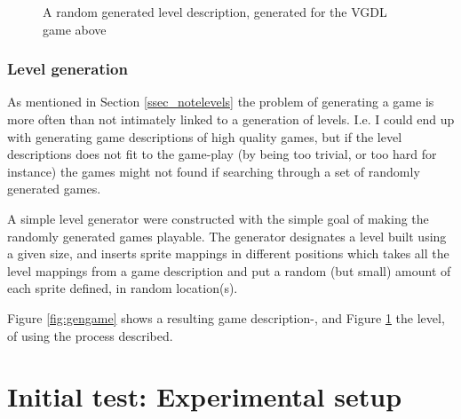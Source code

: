 \documentclass[a4paper,titlepage,final]{report}
\begin{document}
\begin{figure}[!ht]
\centering
\begin{vgdldesc}[linewidth=14cm]
               
  $          & 
               
               
     (  %
\end{vgdldesc}
\caption{A random generated level description, generated for the VGDL game above}
\label{fig:gengamelvl}
\end{figure}



\subsubsection*{Level generation}
As mentioned in Section \ref{ssec_notelevels} the problem of generating a game is more often than not intimately linked to a generation of levels.
I.e. I could end up with generating game descriptions of high quality games, but if the level descriptions does not fit to the game-play (by being too trivial, or too hard for instance) the games might not found if searching through a set of randomly generated games.

A simple level generator were constructed with the simple goal of making the randomly generated games playable.
The generator designates a level built using a given size, and inserts sprite mappings in different positions which takes all the level mappings from a game description and put a random (but small) amount of each sprite defined, in random location(s).

Figure \ref{fig:gengame} shows a resulting game description-, and Figure \ref{fig:gengamelvl} the level, of using the process described.



\section{Initial test: Experimental setup}
\label{sec_task1inittestsetup}
\end{document}
